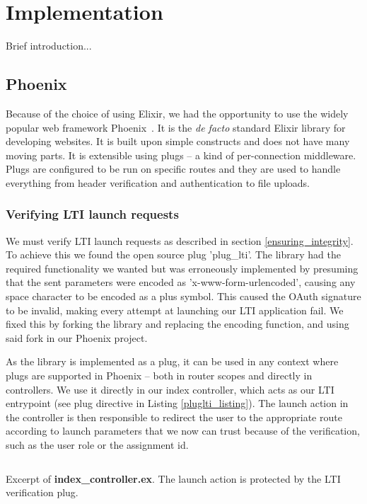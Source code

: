 \chapter{Implementation}

Brief introduction...

\section{Phoenix}

Because of the choice of using Elixir, we had the opportunity to use the widely popular web framework Phoenix~\cite{Phoenix}. It is the \textit{de facto} standard Elixir library for developing websites. It is built upon simple constructs and does not have many moving parts. It is extensible using plugs -- a kind of per-connection middleware. Plugs are configured to be run on specific routes and they are used to handle everything from header verification and authentication to file uploads.

\subsection{Verifying LTI launch requests}

We must verify LTI launch requests as described in section \ref{ensuring_integrity}. To achieve this we found the open source plug 'plug\_lti'. The library had the required functionality we wanted but was erroneously implemented by presuming that the sent parameters were encoded as 'x-www-form-urlencoded', causing any space character to be encoded as a plus symbol. This caused the OAuth signature to be invalid, making every attempt at launching our LTI application fail. We fixed this by forking the library and replacing the encoding function, and using said fork in our Phoenix project.

As the library is implemented as a plug, it can be used in any context where plugs are supported in Phoenix -- both in router scopes and directly in controllers. We use it directly in our index controller, which acts as our LTI entrypoint (see plug directive in Listing \ref{pluglti_listing}). The launch action in the controller is then responsible to redirect the user to the appropriate route according to launch parameters that we now can trust because of the verification, such as the user role or the assignment id.

\begin{listing}
    \inputminted[firstline=8,lastline=27]{elixir}{code/server/lib/thesis_web/controllers/index_controller.ex}
    \caption{Excerpt of \textbf{index\_controller.ex}. The launch action is protected by the LTI verification plug.}
    \label{pluglti_listing}
\end{listing}

